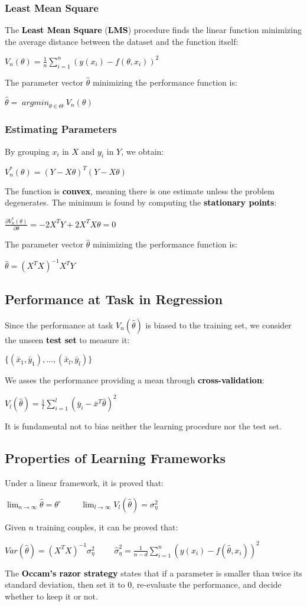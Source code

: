 \documentclass{article}
\DeclareMathOperator*{\argmin}{\textit{argmin}}
\newcommand{\bb}[1]{\textcolor{black}{\textbf{#1}}}
\newcommand{\rr}[1]{\textcolor{black}{#1}}
\newcommand{\cc}[1]{\begin{center}\textcolor{black}{#1}\end{center}}
\begin{document}
\subsubsection{Least Mean Square}
The \bb{Least Mean Square} (\bb{LMS}) procedure finds the linear function minimizing the average distance between the dataset and the function itself:
\cc{$V_n(\theta) = \displaystyle\frac{1}{n}\displaystyle\sum^n_{i = 1}(y(x_i) - f(\theta, x_i))^2$}
The parameter vector \rr{$\hat{\theta}$} minimizing the performance function is:
\cc{$\hat{\theta} = \displaystyle\argmin_{\theta \in \Theta} V_n(\theta)$}
\subsubsection{Estimating Parameters}
By grouping \rr{$x_i$} in \rr{$X$} and \rr{$y_i$} in \rr{$Y$}, we obtain:
\cc{$V_n^*(\theta) = (Y - X\theta)^T(Y - X\theta)$}
The function is \bb{convex}, meaning there is one estimate unless the problem degenerates. The minimum is found by computing the \bb{stationary points}:
\cc{$\displaystyle\frac{\partial V^*_n(\theta)}{\partial\theta} = -2X^TY + 2X^TX\theta=0$}
The parameter vector \rr{$\hat{\theta}$} minimizing the performance function is:
\cc{$\hat{\theta} = (X^TX)^{-1} X^TY$}

\subsection{Performance at Task in Regression}
Since the performance at task \rr{$V_n(\hat{\theta})$} is biased to the training set, we consider the unseen \bb{test set} to measure it:
\cc{$\{(\bar{x}_1, \bar{y}_1), \dots, (\bar{x}_l, \bar{y}_l)\}$}
We asses the performance providing a mean through \bb{cross-validation}:
\cc{$V_l(\hat{\theta}) = \displaystyle\frac{1}{l}\displaystyle\sum^l_{i = 1}(\bar{y}_i - \bar{x}^T\hat{\theta})^2$}
It is fundamental not to bias neither the learning procedure nor the test set.

\subsection{Properties of Learning Frameworks}
Under a linear framework, it is proved that:
\cc{$\displaystyle\lim_{n\rightarrow \infty} \hat{\theta} = \theta^\circ$ \ \ \ \ $\displaystyle\lim_{l\rightarrow \infty} V_l(\hat{\theta}) = \sigma^2_\eta$}
Given \rr{$n$} training couples, it can be proved that:
\cc{$Var(\hat{\theta}) = (X^TX)^{-1}\sigma^2_\eta$ \ \ \ \ $\hat{\sigma}^2_\eta = \displaystyle\frac{1}{n - d}\displaystyle\sum^n_{i = 1}(y(x_i)-f(\hat{\theta}, x_i))^2$}
The \bb{Occam's razor strategy} states that if a parameter is smaller than twice its standard deviation, then set it to \rr{$0$}, re-evaluate the performance, and decide whether to keep it or not.
\end{document}
